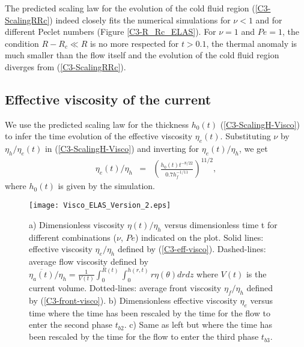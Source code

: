 The predicted scaling  law for the evolution of the  cold fluid region
(\ref{C3-ScalingRRc})  indeed closely  fits the  numerical simulations
for    $\nu<1$   and    for   different    Peclet   numbers    (Figure
\ref{C3-R_Rc_ELAS}). For $\nu=1$ and  $Pe=1$, the condition $R-R_c \ll R$
is no more respected for $t>0.1$,  the thermal anomaly is much smaller
than  the flow  itself  and the  evolution of  the  cold fluid  region
diverges from (\ref{C3-ScalingRRc}).

\subsection{Effective viscosity of the current}
\label{C3-sec:effect-visc-blist-e}

We  use  the   predicted  scaling  law  for   the  thickness  $h_0(t)$
(\ref{C3-ScalingH-Visco}) to infer the time evolution of the effective
viscosity  $\eta_e(t)$. Substituting  $\nu$  by $\eta_h/\eta_e(t)$  in
(\ref{C3-ScalingH-Visco}) and inverting for $\eta_e(t)/\eta_h$, we get
\begin{eqnarray}
  \eta_e(t)/\eta_h&=& \left(\frac{h_0(t)t^{-8/22}}{0.7 h_f^{-1/11}}\right)^{11/2}\label{C3-eff-visco},
\end{eqnarray}
where $h_0(t)$ is given by the simulation.
\begin{figure}[h!]
  \begin{center}
    \graphicspath{ {/Users/thorey/Documents/These/Projet/Refroidissement/Skin_Model/Figure/JFM_V13/} }
    \texttt{[image: Visco\_ELAS\_Version\_2.eps]}
    \caption{a)   Dimensionless   viscosity  $\eta(t)/\eta_h$   versus
      dimensionless time  t for  different combinations  ($\nu$, $Pe$)
      indicated  on  the  plot.    Solid  lines:  effective  viscosity
      $\eta_e/\eta_h$ defined  by (\ref{C3-eff-visco}).  Dashed-lines:
      average         flow         viscosity        defined         by
      $\overline{\eta_a(t)}/\eta_h                                   =
      \frac{1}{V(t)}\int_0^{R(t)}\int_0^{h(r,t)} r \eta(\theta) dr dz$
      where $V(t)$ is the current volume.  Dotted-lines: average front
      viscosity $\eta_f/\eta_h$ defined by (\ref{C3-front-visco}).  b)
      Dimensionless effective viscosity $\eta_e$ versus time where the
      time has  been rescaled by  the time for  the flow to  enter the
      second phase  $t_{b2}$. c) Same as  left but where the  time has
      been rescaled by the time for  the flow to enter the third phase
      $t_{b3}$.  }
    \label{C3-Visco_ELAS_Version_2}
  \end{center}
\end{figure}


